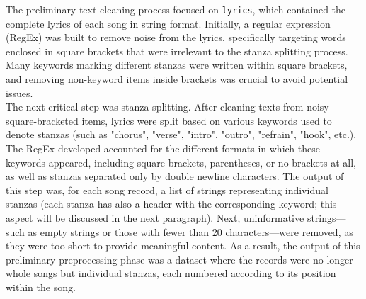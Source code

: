 The preliminary text cleaning process focused on \texttt{lyrics},
which contained the complete lyrics of each song in string format.
Initially, a regular expression (RegEx) was built to remove noise from the
lyrics, specifically targeting words enclosed in square brackets that were
irrelevant to the stanza splitting process. Many keywords marking different
stanzas were written within square brackets, and removing non-keyword items
inside brackets was crucial to avoid potential issues.\\

The next critical step was stanza splitting. After cleaning texts from
noisy square-bracketed items, lyrics were split based on various keywords
used to denote stanzas (such as "chorus", "verse", "intro", "outro", "refrain", "hook", etc.).
The RegEx developed accounted for the different formats in which these keywords
appeared, including square brackets, parentheses, or no brackets at all, as well
as stanzas separated only by double newline characters.
The output of this step was, for each song record, a list of strings
representing individual stanzas (each stanza has also a header with the corresponding
keyword; this aspect will be discussed in the next paragraph).
Next, uninformative strings—such as empty strings or those with fewer
than 20 characters—were removed, as they were too short to provide meaningful
content.
As a result, the output of this preliminary preprocessing phase was a dataset
where the records were no longer whole songs but individual stanzas, each
numbered according to its position within the song.\\



